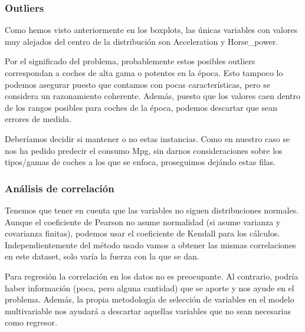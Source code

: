\subsubsection{Outliers}

Como hemos visto anteriormente en los boxplots, las únicas variables con valores muy alejados del centro de la distribución son Acceleration y Horse\_power.

Por el significado del problema, probablemente estos posibles outliers correspondan a coches de alta gama o potentes en la época. Esto tampoco lo podemos asegurar puesto que contamos con pocas características, pero se considera un razonamiento coherente. Además, puesto que los valores caen dentro de los rangos posibles para coches de la época, podemos descartar que sean errores de medida.

Deberíamos decidir si mantener o no estas instancias. Como en nuestro caso se nos ha pedido predecir el consumo Mpg, sin darnos consideraciones sobre los tipos/gamas de coches a los que se enfoca, proseguimos dejándo estas filas.

\subsubsection{Análisis de correlación}

Tenemos que tener en cuenta que las variables no siguen distribuciones normales. Aunque el coeficiente de Pearson no asume normalidad (si asume varianza y covarianza finitas), podemos usar el coeficiente de Kendall para los cálculos. Independientemente del método usado vamos a obtener las mismas correlaciones en este dataset, solo varía la fuerza con la que se dan.

Para regresión la correlación en los datos no es preocupante. Al contrario, podría haber información (poca, pero alguna cantidad) que se aporte y nos ayude en el problema. Además, la propia metodología de selección de variables en el modelo multivariable nos ayudará a descartar aquellas variables que no sean necesarias como regresor.

